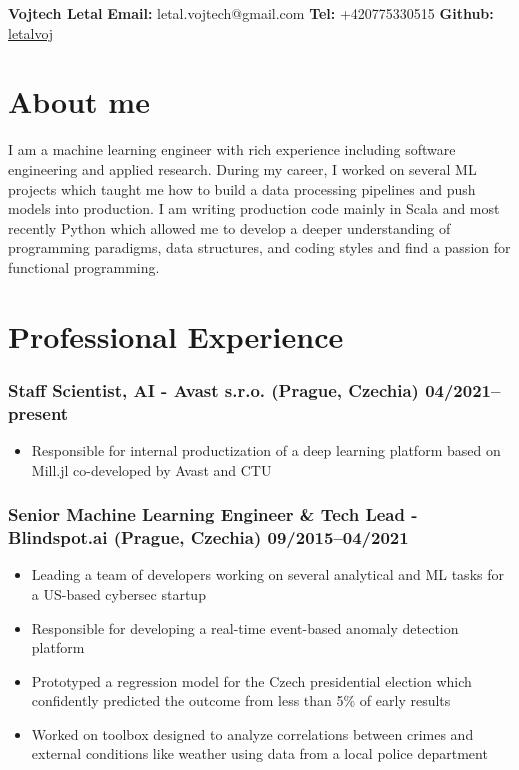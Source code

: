 \documentclass[11pt]{article}
\begin{document}
\clearpage
\thispagestyle{empty}
{\center\bfseries\huge Vojtech Letal}
\hfill
{\bf Email:} letal.vojtech@gmail.com
{\bf Tel:} +420775330515
{\bf Github:} \href{http://github.com/letalvoj}{letalvoj}

\section*{About me}
I am a machine learning engineer with rich experience including software engineering and applied research.
During my career, I worked on several ML projects which taught me how to build a data processing pipelines and push models into production.
I am writing production code mainly in Scala and most recently Python which allowed me to develop a deeper understanding of programming paradigms, data structures, and coding styles and find a passion for functional programming.

\section*{Professional Experience}
\subsubsection*{\bf Staff Scientist, AI - Avast s.r.o. (Prague, Czechia) \hfill 04/2021--present}
	 \begin{itemize}
		\setlength\itemsep{-0.25em}
		\item Responsible for internal productization of a deep learning platform based on Mill.jl co-developed by Avast and CTU
	 \end{itemize}

\subsubsection*{\bf Senior Machine Learning Engineer \& Tech Lead - Blindspot.ai (Prague, Czechia) \hfill 09/2015--04/2021}
	 \begin{itemize}
		\setlength\itemsep{-0.25em}
		\item Leading a team of developers working on several analytical and ML tasks for a US-based cybersec startup
		\item Responsible for developing a real-time event-based anomaly detection platform
		\item Prototyped a regression model for the Czech presidential election which confidently predicted the outcome from less than 5\% of early results
		\item Worked on toolbox designed to analyze correlations between crimes and external conditions like weather using data from a local police department
	 \end{itemize}
\end{document}
